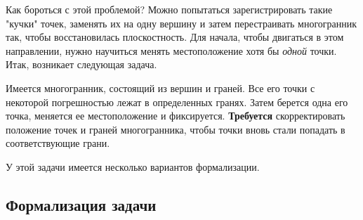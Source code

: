 \documentclass[a4paper,12pt, titlepage]{article}
\begin{document}
\begin{flushleft}
  Как бороться с этой проблемой? Можно попытаться зарегистрировать такие "кучки" точек, заменять их на одну
вершину и затем перестраивать многогранник так, чтобы восстановилась плоскостность. Для начала, чтобы 
двигаться в этом направлении, нужно научиться менять местоположение хотя бы \textit{одной} точки. Итак,
возникает следующая задача.
\end{flushleft}

\begin{flushleft}
  Имеется многогранник, состоящий из вершин и граней. Все его точки с некоторой
погрешностью лежат в определенных гранях. Затем берется одна его точка,
меняется ее местоположение и фиксируется. \textbf{Требуется} скорректировать положение
точек и граней многогранника, чтобы точки вновь стали попадать в соответствующие
грани.
\end{flushleft}

\begin{flushleft}
  У этой задачи имеется несколько вариантов формализации.
\end{flushleft}

\subsection{Формализация задачи}
\end{document}
